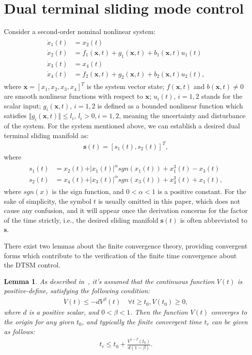 \documentclass[3p]{elsarticle}
\theoremstyle{plain}
\newtheorem{mylem}{Lemma}
\theoremstyle{remark}
\begin{document}
\section{Dual terminal sliding mode control}\label{sec:2}
Consider a second-order nominal nonlinear system:
\begin{align}
\begin{split}
\dot x_1(t) &= x_2(t)\\
\dot x_2(t) &= f_1(\bm x,t)+g_1(\bm x,t)+b_1(\bm x,t)u_1(t)\\
\dot x_3(t) &= x_4(t)\\
\dot x_4(t) &= f_2(\bm x,t)+g_2(\bm x,t)+b_2(\bm x,t)u_2(t),\label{eq:second-order system}
\end{split}
\end{align}
where $\bm x = [x_1,x_2,x_3,x_4]^T$ is the system vector state; $f(\bm x,t)$ and $b(\bm x,t)\neq 0$ are smooth nonlinear functions with respect to $\bm x$; $u_i(t)$, $i=1,2$ stands for the scalar input; $g_i(\bm x,t)$, $i=1,2$  is defined as a bounded nonlinear function which satisfies $\Vert g_i(\bm x,t)\Vert\le l_i$, $l_i>0, i=1,2$, meaning the uncertainty and disturbance of the system. For the system mentioned above, we can establish a desired dual terminal sliding manifold as:
\begin{align}
\bm s(t) = [s_1(t),s_2(t)]^T,
\end{align}
where
\begin{align}
\begin{split}
s_1(t) &= x_2(t)+\vert x_1(t)\vert^{\alpha} sgn(x_1(t))+x_1^3(t)-x_3(t)\\
s_2(t) &= x_4(t)+\vert x_3(t)\vert^{\alpha} sgn(x_3(t))+x_3^3(t)+x_1(t),\label{eq:dual sliding manifold}
\end{split}
\end{align}
where $sgn(x)$ is the sign function, and $0<\alpha<1$ is a positive constant. For the sake of simplicity, the symbol $t$ is usually omitted in this paper, which does not cause any confusion, and it will appear once the derivation concerns for the factor of the time strictly, i.e., the desired sliding manifold $\bm s(t)$ is often abbreviated to $\bm s$.\par
There exist two lemmas about the finite convergence theory, providing convergent forms which contribute to the verification of the finite time convergence about the DTSM control.
\begin{mylem}
As described in~\cite{moulay2006finite}, it's assumed that the continuous function $V(t)$ is positive-define, satisfying the following condition:
\begin{align}
\dot V(t)\le -dV^\beta(t)\quad\forall t\ge t_0, V(t_0)\ge 0,
\end{align}
where $d$ is a positive scalar, and $0<\beta<1$. Then the function $V(t)$ converges to the origin for any given $t_0$, and typically the finite convergent time $t_r$ can be given as follows:
\begin{align}
t_r \le t_0+\frac{V^{1-\beta}(t_0)}{d(1-\beta)}.
\end{align}\label{lemma:1}
\end{mylem}
\end{document}

